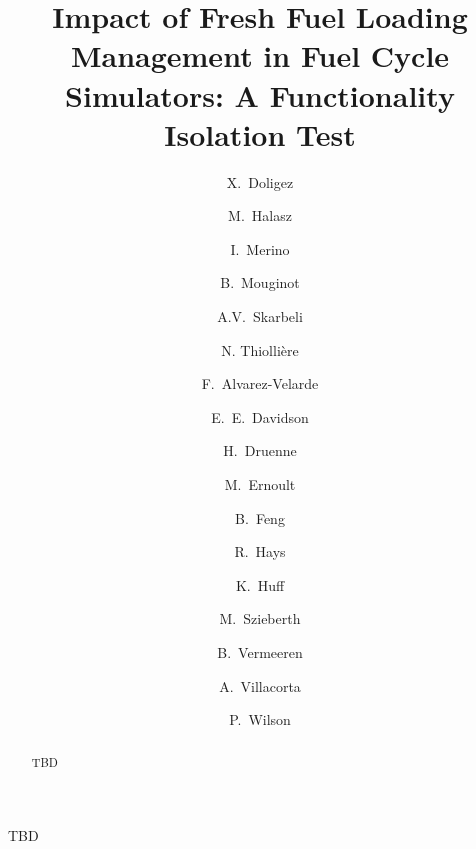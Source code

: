 \documentclass[review]{elsarticle}
\begin{document}
\begin{frontmatter}

\title{Impact of Fresh Fuel Loading Management in Fuel Cycle Simulators: A Functionality Isolation Test}



\author[IPNO]{X.~Doligez}
\author[BUD]{M.~Halasz}
\author[MAULE]{I.~Merino}
\author[MAD]{B.~Mouginot}
\author[CIEMAT]{A.V.~Skarbeli}

\author[SUB]{N. Thiolli\`ere }

\author[CIEMAT]{F.~Alvarez-Velarde}
\author[ORNL]{E.~E.~Davidson}
\author[TRACT]{H.~Druenne}
\author[IPNO]{M.~Ernoult}
\author[ANL]{B.~Feng}
\author[INL]{R.~Hays}
\author[UI]{K.~Huff}
\author[BUD]{M.~Szieberth}
\author[TRACT]{B.~Vermeeren}
\author[CIEMAT]{A.~Villacorta}
\author[MAD]{P.~Wilson}


\address[IPNO]{Institut de Physique Nucléaire d’Orsay, CNRS-IN2P3/Univ, Paris-Sud, France}
\address[BUD]{Budapest University of Technology and Economics (BME), Institute of Nuclear Techniques, 1111 Budapest, Müegyetem rkp. 3-9, Hungary}
\address[MAULE]{Catholic University of the Maule, Av. San Miguel 3605, Talca, Chile}
\address[MAD]{Univ. of Wisconsin Madison, Department of Nuclear Engineering and Engineering Physics, Madison, WI, United States}
\address[CIEMAT]{CIEMAT, Avda. Complutense, 40, 28040 Madrid, Spain}
\address[SUB]{Subatech, IMTA-IN2P3/CNRS-Universit\'e, Nantes, F-44307, France}

\address[ORNL]{Oak Ridge National Laboratory, Building 5700, Mail Stop 6172, Oak Ridge, TN 37831, United States}
\address[TRACT]{Tractebel Engie, Boulevard Simón Bolívar 34-36, 1000 Brussels, Belgium}
\address[ANL]{Argonne National Laboratory, 9700 Cass Ave., Lemont, IL 60439, USA}
\address[INL]{Idaho National Laboratory, 2525 Fremont Ave., Idaho Falls, ID 83402, USA}
\address[UI]{University of Illinois, 104 S. Wright St., Urbana, IL 61801, USA}


\begin{abstract}

TBD

\end{abstract}

\begin{keyword}

TBD 

\end{keyword}

\end{frontmatter}
\end{document}
